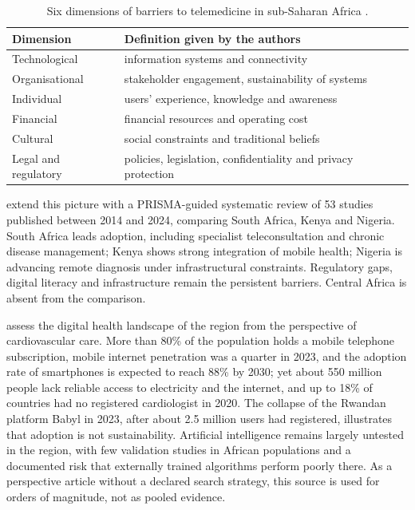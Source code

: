 \documentclass[11pt,a4paper,oneside]{report}
\begin{document}
\begin{table}[htbp]
\centering\small
\caption{Six dimensions of barriers to telemedicine in sub-Saharan Africa \parencite{dodoo2022}.}\label{tab:barriers}
\begin{tabularx}{\textwidth}{@{}>{\raggedright\arraybackslash}p{3.4cm} X@{}}
\toprule
\textbf{Dimension} & \textbf{Definition given by the authors} \\
\midrule
Technological & information systems and connectivity \\
Organisational & stakeholder engagement, sustainability of systems \\
Individual & users' experience, knowledge and awareness \\
Financial & financial resources and operating cost \\
Cultural & social constraints and traditional beliefs \\
Legal and regulatory & policies, legislation, confidentiality and privacy protection \\
\bottomrule
\end{tabularx}
\end{table}

\Textcite{agbeyangi2025} extend this picture with a PRISMA-guided systematic review of 53 studies published between 2014 and 2024, comparing South Africa, Kenya and Nigeria. South Africa leads adoption, including specialist teleconsultation and chronic disease management; Kenya shows strong integration of mobile health; Nigeria is advancing remote diagnosis under infrastructural constraints. Regulatory gaps, digital literacy and infrastructure remain the persistent barriers. Central Africa is absent from the comparison.

\Textcite{segun2025} assess the digital health landscape of the region from the perspective of cardiovascular care. More than 80\% of the population holds a mobile telephone subscription, mobile internet penetration was a quarter in 2023, and the adoption rate of smartphones is expected to reach 88\% by 2030; yet about 550 million people lack reliable access to electricity and the internet, and up to 18\% of countries had no registered cardiologist in 2020. The collapse of the Rwandan platform Babyl in 2023, after about 2.5 million users had registered, illustrates that adoption is not sustainability. Artificial intelligence remains largely untested in the region, with few validation studies in African populations and a documented risk that externally trained algorithms perform poorly there. As a perspective article without a declared search strategy, this source is used for orders of magnitude, not as pooled evidence.
\end{document}
